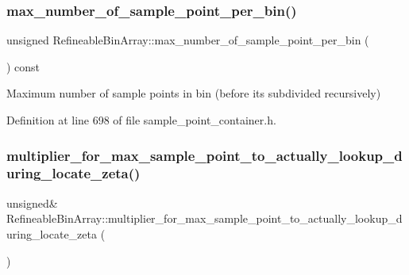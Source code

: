 \subsubsection{\texorpdfstring{max\+\_\+number\+\_\+of\+\_\+sample\+\_\+point\+\_\+per\+\_\+bin()}{max\_number\_of\_sample\_point\_per\_bin()}}
{\footnotesize\ttfamily unsigned Refineable\+Bin\+Array\+::max\+\_\+number\+\_\+of\+\_\+sample\+\_\+point\+\_\+per\+\_\+bin (\begin{DoxyParamCaption}{ }\end{DoxyParamCaption}) const\hspace{0.3cm}{\ttfamily [inline]}}



Maximum number of sample points in bin (before its subdivided recursively) 



Definition at line 698 of file sample\+\_\+point\+\_\+container.\+h.

\mbox{\label{classRefineableBinArray_ae5dc08202a4716df1b2138f3dce84e85}} 
\subsubsection{\texorpdfstring{multiplier\+\_\+for\+\_\+max\+\_\+sample\+\_\+point\+\_\+to\+\_\+actually\+\_\+lookup\+\_\+during\+\_\+locate\+\_\+zeta()}{multiplier\_for\_max\_sample\_point\_to\_actually\_lookup\_during\_locate\_zeta()}}
{\footnotesize\ttfamily unsigned\& Refineable\+Bin\+Array\+::multiplier\+\_\+for\+\_\+max\+\_\+sample\+\_\+point\+\_\+to\+\_\+actually\+\_\+lookup\+\_\+during\+\_\+locate\+\_\+zeta (\begin{DoxyParamCaption}{ }\end{DoxyParamCaption})\hspace{0.3cm}{\ttfamily [inline]}}



